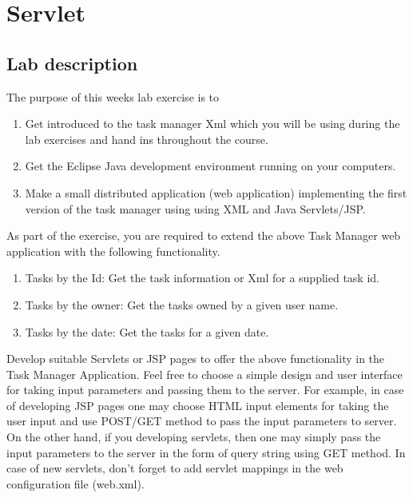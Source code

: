 	\chapter{Servlet}
	
	\section{Lab description}
	\label{servlet_description}
	The purpose of this weeks lab exercise is to
	\begin{enumerate}
	    \item Get introduced to the task manager Xml which you will be using during the lab exercises and hand ins throughout the course.
	    \item Get the Eclipse Java development environment running on your computers.
	    \item Make a small distributed application (web application) implementing the first version of the task manager using using XML and Java Servlets/JSP.
	\end{enumerate}
	As part of the exercise, you are required to extend the above Task Manager web application with the following functionality.
	\begin{enumerate}
	    \item Tasks by the Id: Get the task information or Xml for a supplied task id.
	    \item Tasks by the owner: Get the tasks owned by a given user name.
	    \item Tasks by the date: Get the tasks for a given date.
	\end{enumerate}
	Develop suitable Servlets or JSP pages to offer the above functionality in the Task Manager Application. Feel free to choose a simple design and user interface for taking input parameters and passing them to the server. For example, in case of developing JSP pages one may choose HTML input elements for taking the user input and use POST/GET method to pass the input parameters to server. On the other hand, if you developing servlets, then one may simply pass the input parameters to the server in the form of query string using GET method. In case of new servlets, don’t forget to add servlet mappings in the web configuration file (web.xml).
	
